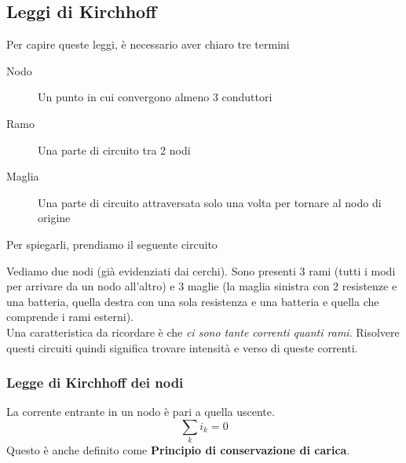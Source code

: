 \subsection{Leggi di Kirchhoff}
Per capire queste leggi, è necessario aver chiaro tre termini
\begin{description}
  \item[Nodo] Un punto in cui convergono almeno 3 conduttori
  \item[Ramo] Una parte di circuito tra 2 nodi
  \item[Maglia] Una parte di circuito attraversata solo una volta per tornare al nodo di origine
\end{description}
Per spiegarli, prendiamo il seguente circuito
\begin{center}
\end{center}
Vediamo due nodi (già evidenziati dai cerchi). Sono presenti 3 rami (tutti i modi per arrivare
da un nodo all'altro) e 3 maglie (la maglia sinistra con 2 resistenze e una batteria, quella destra
con una sola resistenza e una batteria e quella che comprende i rami esterni).\\
Una caratteristica da ricordare è che \emph{ci sono tante correnti quanti rami}. Risolvere questi
circuiti quindi significa trovare intensità e verso di queste correnti.

\subsubsection{Legge di Kirchhoff dei nodi}
La corrente entrante in un nodo è pari a quella uscente.
\begin{equation*}
  \sum_k i_k = 0
\end{equation*}
Questo è anche definito come \textbf{Principio di conservazione di carica}.

